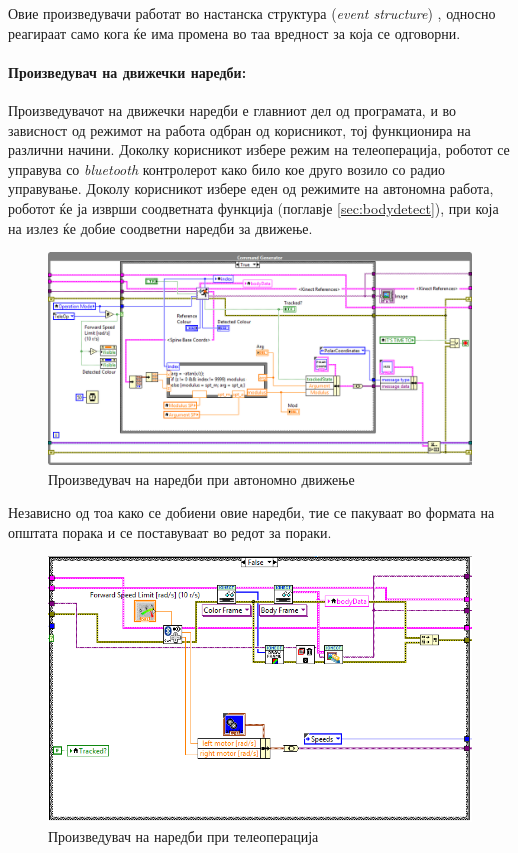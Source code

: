 \documentclass[12pt]{article}
\begin{document}
      Овие произведувачи работат во настанска структура (\textit{event structure}) \cite{lvforeveryone}, односно реагираат само кога ќе има промена во таа вредност за која се одговорни.

    \paragraph{Произведувач на движечки наредби:\\}
      Произведувачот на движечки наредби е главниот дел од програмата, и во зависност од режимот на работа одбран од корисникот, тој функционира на различни начини. Доколку корисникот избере режим на телеоперација, роботот се управува со \textit{bluetooth} контролерот како било кое друго возило со радио управување. Доколу корисникот избере еден од режимите на автономна работа, роботот ќе ја изврши соодветната функција (поглавје \ref{sec:bodydetect}), при која на излез ќе добие соодветни наредби за движење.
      \begin{figure}[H]
        \centering
        \includegraphics[angle=-90, scale=0.75]{./images/command_generator_true.png} %
        \caption{Произведувач на наредби при автономно движење}
        \end{figure}
      Независно од тоа како се добиени овие наредби, тие се пакуваат во формата на општата порака и се поставуваат во редот за пораки.
      \begin{figure}[H]
        \centering
        \includegraphics[width=0.8\linewidth]{./images/command_generator_false.png}
        \caption{Произведувач на наредби при телеоперација}
        \end{figure}
\end{document}
